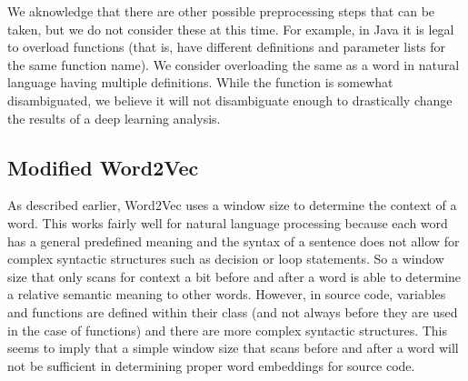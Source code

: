 We aknowledge that there are other possible preprocessing steps that can be taken, but we do not consider these at this time. For example, in Java it is legal to overload functions (that is, have different definitions and parameter lists for the same function name). We consider overloading the same as a word in natural language having multiple definitions. While the function is somewhat disambiguated, we believe it will not disambiguate enough to drastically change the results of a deep learning analysis.

\subsection{Modified Word2Vec}

As described earlier, Word2Vec uses a window size to determine the context of a word. This works fairly well for natural language processing because each word has a general predefined meaning and the syntax of a sentence does not allow for complex syntactic structures such as decision or loop statements. So a window size that only scans for context a bit before and after a word is able to determine a relative semantic meaning to other words. However, in source code, variables and functions are defined within their class (and not always before they are used in the case of functions) and there are more complex syntactic structures. This seems to imply that a simple window size that scans before and after a word will not be sufficient in determining proper word embeddings for source code.

